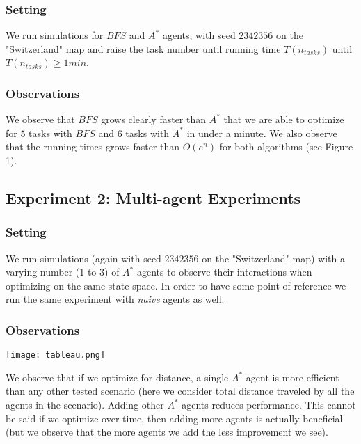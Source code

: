 \documentclass[11pt]{article}
\begin{document}
\subsubsection{Setting}
We run simulations for $BFS$ and $A^*$ agents, with seed $2342356$ on the "Switzerland" map and raise the task number until running time $T(n_{tasks})$ until $T(n_{tasks})\geq 1min$.

\subsubsection{Observations}

We observe that $BFS$ grows clearly faster than $A^*$ that we are able to optimize for $5$ tasks with $BFS$ and $6$ tasks with $A^*$ in under a minute. We also observe that the running times grows faster than $O(e^n)$ for both algorithms (see Figure 1).


\subsection{Experiment 2: Multi-agent Experiments}



\subsubsection{Setting}
We run simulations (again with seed $2342356$ on the "Switzerland" map) with a varying number (1 to 3) of $A^*$ agents to observe their interactions when optimizing on the same state-space. In order to have some point of reference we run the same experiment with \emph{naive} agents as well.

\subsubsection{Observations}
\begin{center}
	\texttt{[image: tableau.png]}
\end{center}
We observe that if we optimize for distance, a single $A^*$ agent is more efficient than any other tested scenario (here we consider total distance traveled by all the agents in the scenario). Adding other $A^*$ agents reduces performance. This cannot be said if we optimize over time, then adding more agents is actually beneficial (but we observe that the more agents we add the less improvement we see).
\end{document}
